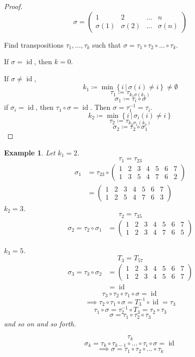 \documentclass{article}
\newcounter{lecref}[section]
\numberwithin{lecref}{section}
\newtheorem{example}[lecref]{Example}
\newcommand{\setdef}[2]{\left\{\left.#1\,\right|\,#2\right\}}
\begin{document}
\begin{proof}
  \[ \sigma = \begin{pmatrix} 1 & 2 & \dots & n \\ \sigma(1) & \sigma(2) & \dots & \sigma(n) \end{pmatrix} \]

  Find transpositions $\tau_1, \dots, \tau_k$ such that $\sigma = \tau_1 \circ \tau_2 \circ \dots \circ \tau_k$.

  If $\sigma = \operatorname{id}$, then $k=0$.

  If $\sigma \neq \operatorname{id}$,
  \[ k_1 \coloneqq \min\setdef{i}{\sigma(i) \neq i} \neq \emptyset \]
  \[ \tau_1 \coloneqq \tau_{k_1 \sigma(k_1)} \]
  \[ \sigma_1 \coloneqq \tau_i \circ \sigma \]
  if $\sigma_i = \operatorname{id}$, then $\tau_1 \circ \sigma = \operatorname{id}$. Then $\sigma = \tau_1^{-1} = \tau_i$.
  \[ k_2 \coloneqq \min\setdef{i}{\sigma_i(i) \neq i} \]
  \[ \tau_2 \coloneqq \tau_{k_2 \sigma_1(k_2)} \]
  \[ \sigma_2 \coloneqq \tau_2 \circ \sigma_1 \]
\end{proof}

\begin{example}
  Let $k_1 = 2$.
  \[ \tau_1 = \tau_{23} \]
  \begin{align*}
    \sigma_1 &= \tau_{23} \circ \begin{pmatrix} 1 & 2 & 3 & 4 & 5 & 6 & 7 \\ 1 & 3 & 5 & 4 & 7 & 6 & 2 \end{pmatrix} \\
      &= \begin{pmatrix} 1 & 2 & 3 & 4 & 5 & 6 & 7 \\ 1 & 2 & 5 & 4 & 7 & 6 & 3 \end{pmatrix}
  \end{align*}
  $k_2 = 3$.
  \[ \tau_2 = \tau_{35} \]
  \begin{align*}
    \sigma_2 = \tau_2 \circ \sigma_1 &= \begin{pmatrix} 1 & 2 & 3 & 4 & 5 & 6 & 7 \\ 1 & 2 & 3 & 4 & 7 & 6 & 5 \end{pmatrix}
  \end{align*}

  $k_3 = 5$.
  \[ T_3 = T_{57} \]
  \begin{align*}
    \sigma_3 = \tau_3 \circ \sigma_2 &= \begin{pmatrix} 1 & 2 & 3 & 4 & 5 & 6 & 7 \\ 1 & 2 & 3 & 4 & 5 & 6 & 7 \end{pmatrix} \\
      &= \operatorname{id}
  \end{align*}
  \[ \tau_3 \circ \tau_2 \circ \tau_1 \circ \sigma = \operatorname{id} \]
  \[ \implies \tau_2 \circ \tau_1 \circ \sigma = T_3^{-1} \circ \operatorname{id} = \tau_3 \]
  \[ \tau_1 \circ \sigma = \tau_2^{-1} \circ T_3 = \tau_2 \circ \tau_3 \]
  \[ \sigma = \tau_1 \circ \tau_2 \circ \tau_3 \]
  and so on and so forth.

  \[ \tau_k \]
  \[ \sigma_k = \tau_k \circ \tau_{k-1} \circ \dots \circ \tau_{i} \circ \sigma = \operatorname{id} \]
  \[ \implies \sigma = \tau_1 \circ \tau_2 \circ \dots \circ \tau_k \]
\end{example}
\end{document}
